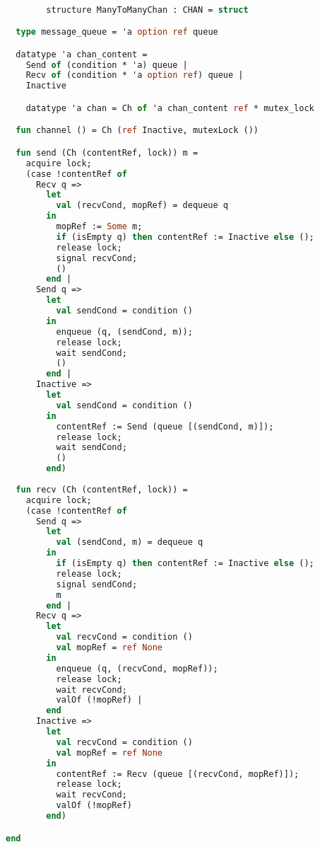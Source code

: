 \documentclass{article}
\begin{document}
      \begin{lstlisting}[language=ML, style=mystyle]

        structure ManyToManyChan : CHAN = struct

  type message_queue = 'a option ref queue

  datatype 'a chan_content = 
    Send of (condition * 'a) queue | 
    Recv of (condition * 'a option ref) queue | 
    Inactive

	datatype 'a chan = Ch of 'a chan_content ref * mutex_lock 

  fun channel () = Ch (ref Inactive, mutexLock ())

  fun send (Ch (contentRef, lock)) m = 
    acquire lock;
    (case !contentRef of
      Recv q => 
        let
          val (recvCond, mopRef) = dequeue q
        in
          mopRef := Some m;
          if (isEmpty q) then contentRef := Inactive else (); 
          release lock;
          signal recvCond; 
          () 
        end |
      Send q => 
        let
          val sendCond = condition () 
        in
          enqueue (q, (sendCond, m));
          release lock;
          wait sendCond;
          () 
        end |
      Inactive => 
        let
          val sendCond = condition () 
        in
          contentRef := Send (queue [(sendCond, m)]);
          release lock;
          wait sendCond;
          ()
        end)
   
  fun recv (Ch (contentRef, lock)) =  
    acquire lock;
    (case !contentRef of 
      Send q =>
        let
          val (sendCond, m) = dequeue q
        in
          if (isEmpty q) then contentRef := Inactive else (); 
          release lock;
          signal sendCond; 
          m
        end |
      Recv q =>
        let
          val recvCond = condition ()
          val mopRef = ref None
        in
          enqueue (q, (recvCond, mopRef));
          release lock;
          wait recvCond;
          valOf (!mopRef) | 
        end
      Inactive =>
        let
          val recvCond = condition ()
          val mopRef = ref None
        in
          contentRef := Recv (queue [(recvCond, mopRef)]);
          release lock;
          wait recvCond;
          valOf (!mopRef)
        end)

end

\end{lstlisting}

\begin{lstlisting}[language=ML, style=mystyle]
\end{lstlisting}
\end{document}
